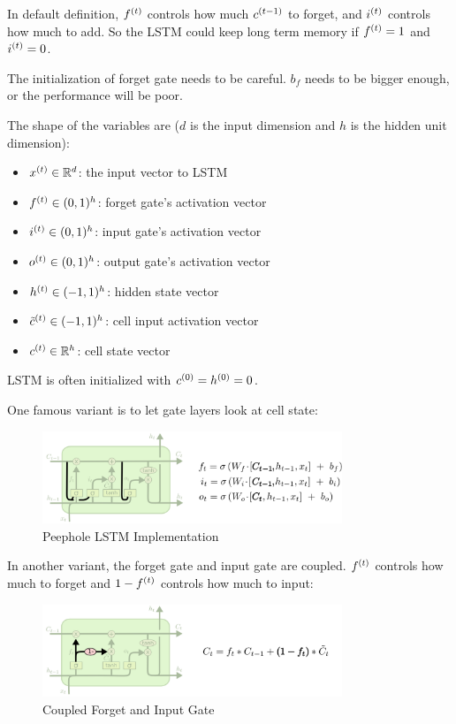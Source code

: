In default definition, ${f}^{(t)}$ controls how much ${c}^{(t-1)}$ to forget, and ${i}^{(t)}$ controls how much to add. So the LSTM could keep long term memory if ${f}^{(t)} = 1$ and ${i}^{(t)} = 0$.

The initialization of forget gate needs to be careful. $b_f$ needs to be bigger enough, or the performance will be poor.

The shape of the variables are ($d$ is the input dimension and $h$ is the hidden unit dimension):
\begin{itemize}
    \item ${x}^{(t)} \in \mathbb{R}^d$: the input vector to LSTM
    \item ${f}^{(t)} \in (0,1)^h$: forget gate's activation vector
    \item ${i}^{(t)} \in (0,1)^h$: input gate's activation vector
    \item ${o}^{(t)} \in (0,1)^h$: output gate's activation vector
    \item ${h}^{(t)} \in (-1,1)^h$: hidden state vector
    \item ${\tilde{c}}^{(t)} \in (-1,1)^h$: cell input activation vector
    \item ${c}^{(t)} \in \mathbb{R}^h$: cell state vector
\end{itemize}

LSTM is often initialized with ${c}^{(0)} = {h}^{(0)} = 0$.



\begin{definition}
    One famous variant is to let gate layers look at cell state:
    \begin{figure}[H]
\includegraphics[width=0.8\textwidth]{pic/04/LSTM3-var-peepholes.png}
\centering
\caption{Peephole LSTM Implementation}
\end{figure}
\end{definition}

\begin{definition}
    In another variant, the forget gate and input gate are coupled. ${f}^{(t)}$ controls how much to forget and $1- {f}^{(t)}$ controls how much to input:
    \begin{figure}[H]
\includegraphics[width=0.8\textwidth]{pic/04/LSTM3-var-tied.png}
\centering
\caption{Coupled Forget and Input Gate}
\end{figure}
\end{definition}


